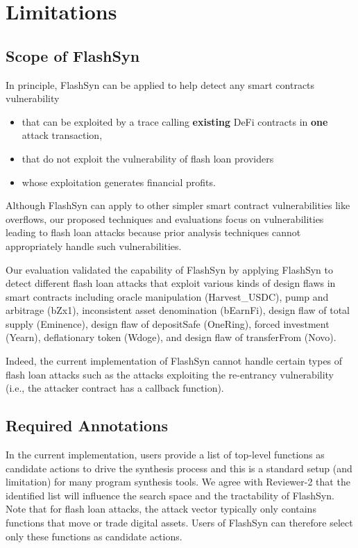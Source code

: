 \chapter{Limitations}
\label{sec:threats}

\section{Scope of FlashSyn}

In principle, FlashSyn can be applied to help detect any smart contracts vulnerability 

\begin{itemize}
\item that can be exploited by a trace calling \textbf{existing} DeFi contracts in \textbf{one} attack transaction,

\item that do not exploit the vulnerability of flash loan providers

\item whose exploitation generates financial profits.

\end{itemize}

Although FlashSyn can apply to other simpler smart contract vulnerabilities like overflows, our proposed techniques and evaluations focus on vulnerabilities leading to flash loan attacks because prior analysis techniques cannot appropriately handle such vulnerabilities. 

Our evaluation validated the capability of FlashSyn by applying FlashSyn to detect different flash loan attacks that exploit various kinds of design flaws in smart contracts including oracle manipulation (Harvest\_USDC), pump and arbitrage (bZx1), inconsistent asset denomination (bEarnFi), design flaw of total supply (Eminence), design flaw of depositSafe (OneRing), forced investment (Yearn), deflationary token (Wdoge), and design flaw of transferFrom (Novo). 

Indeed, the current implementation of FlashSyn cannot handle certain types of flash loan attacks such as the attacks exploiting the re-entrancy vulnerability (i.e., the attacker contract has a callback function). 


\section{Required Annotations}

In the current implementation, users provide a list of top-level functions as candidate actions to drive the synthesis process and this is a standard setup (and limitation) for many program synthesis tools. We agree with Reviewer-2 that the identified list will influence the search space and the tractability of FlashSyn. Note that for flash loan attacks, the attack vector typically only contains functions that move or trade digital assets. Users of FlashSyn can therefore select only these functions as candidate actions. 

